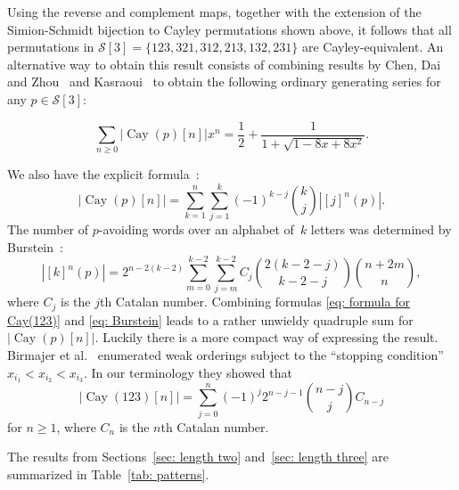 \documentclass[a4paper, 11pt]{article}
\DeclareMathOperator{\Cay}{Cay}
\newcommand{\Sym}{\mathcal{S}}
\theoremstyle{definition}
\begin{document}
Using the reverse and complement maps, together with the extension
of the Simion-Schmidt bijection to Cayley permutations shown above,
it follows that all permutations in $\Sym[3]=\{123,321,312,213,132,231\}$ are
Cayley-equivalent. An alternative way to obtain this result
consists of combining results by Chen, Dai and Zhou~\cite{chen}
and Kasraoui~\cite{KASRAOUI} to
obtain the following ordinary generating series for any $p\in\Sym[3]$:

\begin{equation}\label{eq: OGF Cay(231)}
\sum_{n\ge 0}\bigl|\Cay(p)[n]\bigr|x^n
=\frac{1}{2} + \frac{1}{1+\sqrt{1-8x+8x^2}}.
\end{equation}

We also have the explicit formula~\cite[Proposition~1.1]{KASRAOUI}:
\begin{equation}\label{eq: formula for Cay(123)}
|\Cay(p)[n]|=\sum_{k=1}^n\sum_{j=1}^k(-1)^{k-j}\binom{k}{j}|[j]^n(p)|.
\end{equation}
The number of $p$-avoiding words over an alphabet of~$k$ letters
was determined by Burstein~\cite[Theorem~3.2]{Bur1998}:
\begin{equation}\label{eq: Burstein}
|[k]^n(p)| =2^{n-2(k-2)}\sum_{m=0}^{k-2}\sum_{j=m}^{k-2}C_j\binom{2(k-2-j)}{k-2-j}\binom{n+2m}{n},
\end{equation}
where $C_j$ is the $j$th Catalan number. Combining formulas \eqref{eq:
  formula for Cay(123)} and \eqref{eq: Burstein} leads to a rather
unwieldy quadruple sum for $|\Cay(p)[n]|$. Luckily there is a more
compact way of expressing the result. Birmajer et
al.~\cite{Birmajer-etal} enumerated weak orderings subject to the
``stopping condition'' $x_{i_1}<x_{i_2}<x_{i_3}$. In our terminology
they showed that
\begin{equation}\label{eq:Birmajer-etal}
  \bigl| \Cay(123)[n] \bigr| = \sum_{j=0}^n(-1)^j2^{n-j-1}\binom{n-j}{j}C_{n-j}
\end{equation}
for $n\geq 1$, where $C_n$ is the $n$th Catalan number.

The results from Sections~\ref{sec: length two} and~\ref{sec: length three}
are summarized in Table~\ref{tab: patterns}.
\end{document}

